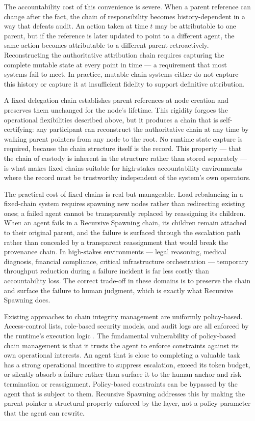 The accountability cost of this convenience is severe.  When a parent reference can change after the fact, the chain of responsibility becomes history-dependent in a way that defeats audit.  An action taken at time $t$ may be attributable to one parent, but if the reference is later updated to point to a different agent, the same action becomes attributable to a different parent retroactively.  Reconstructing the authoritative attribution chain requires capturing the complete mutable state at every point in time --- a requirement that most systems fail to meet.  In practice, mutable-chain systems either do not capture this history or capture it at insufficient fidelity to support definitive attribution.

A fixed delegation chain establishes parent references at node creation and preserves them unchanged for the node's lifetime.  This rigidity forgoes the operational flexibilities described above, but it produces a chain that is self-certifying: any participant can reconstruct the authoritative chain at any time by walking parent pointers from any node to the root.  No runtime state capture is required, because the chain structure itself is the record.  This property --- that the chain of custody is inherent in the structure rather than stored separately --- is what makes fixed chains suitable for high-stakes accountability environments where the record must be trustworthy independent of the system's own operators.

The practical cost of fixed chains is real but manageable.  Load rebalancing in a fixed-chain system requires spawning new nodes rather than redirecting existing ones; a failed agent cannot be transparently replaced by reassigning its children.  When an agent fails in a Recursive Spawning chain, its children remain attached to their original parent, and the failure is surfaced through the escalation path rather than concealed by a transparent reassignment that would break the provenance chain.  In high-stakes environments --- legal reasoning, medical diagnosis, financial compliance, critical infrastructure orchestration --- temporary throughput reduction during a failure incident is far less costly than accountability loss.  The correct trade-off in these domains is to preserve the chain and surface the failure to human judgment, which is exactly what Recursive Spawning does.

Existing approaches to chain integrity management are uniformly policy-based.  Access-control lists, role-based security models, and audit logs are all enforced by the runtime's execution logic \cite{nist2023}.  The fundamental vulnerability of policy-based chain management is that it trusts the agent to enforce constraints against its own operational interests.  An agent that is close to completing a valuable task has a strong operational incentive to suppress escalation, exceed its token budget, or silently absorb a failure rather than surface it to the human anchor and risk termination or reassignment.  Policy-based constraints can be bypassed by the agent that is subject to them.  Recursive Spawning addresses this by making the parent pointer a structural property enforced by the \fact{} layer, not a policy parameter that the agent can rewrite.

